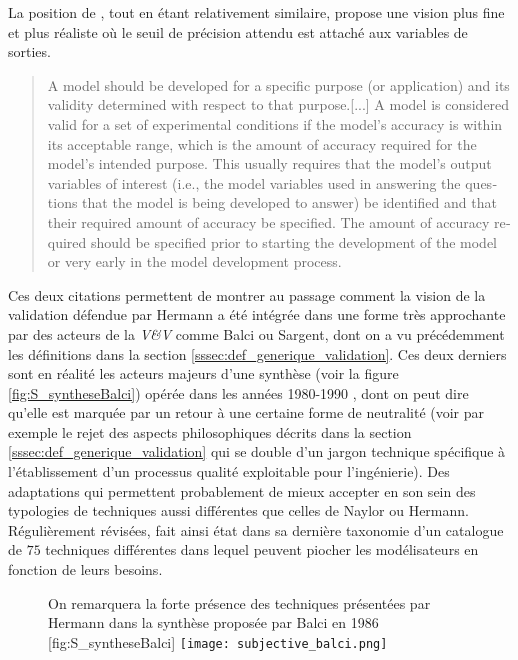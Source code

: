 La position de \textcite[166]{Sargent2010}, tout en étant relativement similaire, propose une vision plus fine et plus réaliste où le seuil de précision attendu est attaché aux variables de sorties.

\foreignblockquote{english}[{\cite[166]{Sargent2010}}]{A model should be developed for a specific purpose (or application) and its validity determined with respect to that purpose.[...] A model is considered valid for a set of experimental conditions if the model’s accuracy is within its acceptable range, which is the amount of accuracy required for the model’s intended purpose. This usually requires that the model’s output variables of interest (i.e., the model variables used in answering the questions that the model is being developed to answer) be identified and that their required amount of accuracy be specified. The amount of accuracy required should be specified prior to starting the development of the model or very early in the model development process.}

Ces deux citations permettent de montrer au passage comment la vision de la validation défendue par Hermann a été intégrée dans une forme très approchante par des acteurs de la \textit{V\&V} comme Balci ou Sargent, dont on a vu précédemment les définitions dans la section \ref{sssec:def_generique_validation}. Ces deux derniers sont en réalité les acteurs majeurs d'une synthèse (voir la figure \ref{fig:S_syntheseBalci}) opérée dans les années 1980-1990 \autocite{Nance2002}, dont on peut dire qu'elle est marquée par un retour à une certaine forme de neutralité (voir par exemple le rejet des aspects philosophiques décrits dans la section \ref{sssec:def_generique_validation} qui se double d'un jargon technique spécifique à l'établissement d'un processus qualité exploitable pour l'ingénierie). Des adaptations qui permettent probablement de mieux accepter en son sein des typologies de techniques aussi différentes que celles de Naylor ou Hermann. Régulièrement révisées, \textcite{Balci1998} fait ainsi état dans sa dernière taxonomie d'un catalogue de $75$ techniques différentes dans lequel peuvent piocher les modélisateurs en fonction de leurs besoins.

\begin{figure}[htbp]
\begin{sidecaption}{On remarquera la forte présence des techniques présentées par Hermann dans la synthèse proposée par Balci en 1986 \autocite{Balci1986}}[fig:S_syntheseBalci]
  \centering
 \texttt{[image: subjective\_balci.png]}
  \end{sidecaption}
\end{figure}

